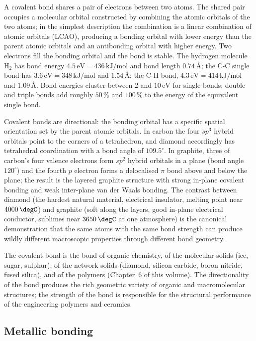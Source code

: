 A covalent bond shares a pair of electrons between two atoms. The
shared pair occupies a molecular orbital constructed by combining the
atomic orbitals of the two atoms; in the simplest description the
combination is a linear combination of atomic orbitals (LCAO),
producing a bonding orbital with lower energy than the parent atomic
orbitals and an antibonding orbital with higher energy. Two electrons
fill the bonding orbital and the bond is stable. The hydrogen molecule
H$_2$ has bond energy $4.5\,\text{eV} = 436\,\text{kJ}/\text{mol}$ and
bond length $0.74\,\si{\angstrom}$; the C-C single bond has $3.6\,
\text{eV} = 348\,\text{kJ}/\text{mol}$ and $1.54\,\si{\angstrom}$; the
C-H bond, $4.3\,\text{eV} = 414\,\text{kJ}/\text{mol}$ and $1.09\,
\si{\angstrom}$. Bond energies cluster between $2$ and $10\,\text{eV}$
for single bonds; double and triple bonds add roughly $50\,\%$ and
$100\,\%$ to the energy of the equivalent single bond.

Covalent bonds are directional: the bonding orbital has a specific
spatial orientation set by the parent atomic orbitals. In carbon the
four $sp^3$ hybrid orbitals point to the corners of a tetrahedron, and
diamond accordingly has tetrahedral coordination with a bond angle of
$109.5^{\circ}$. In graphite, three of carbon's four valence electrons
form $sp^2$ hybrid orbitals in a plane (bond angle $120^{\circ}$) and
the fourth $p$ electron forms a delocalised $\pi$ bond above and below
the plane; the result is the layered graphite structure with strong
in-plane covalent bonding and weak inter-plane van der Waals bonding.
The contrast between diamond (the hardest natural material, electrical
insulator, melting point near $4000\,\degC$) and graphite (soft along
the layers, good in-plane electrical conductor, sublimes near
$3650\,\degC$ at one atmosphere) is the canonical demonstration that
the same atoms with the same bond strength can produce wildly
different macroscopic properties through different bond geometry.

The covalent bond is the bond of organic chemistry, of the molecular
solids (ice, sugar, sulphur), of the network solids (diamond, silicon
carbide, boron nitride, fused silica), and of the polymers (Chapter~6
of this volume). The directionality of the bond produces the rich
geometric variety of organic and macromolecular structures; the
strength of the bond is responsible for the structural performance of
the engineering polymers and ceramics.

\subsection{Metallic bonding}

